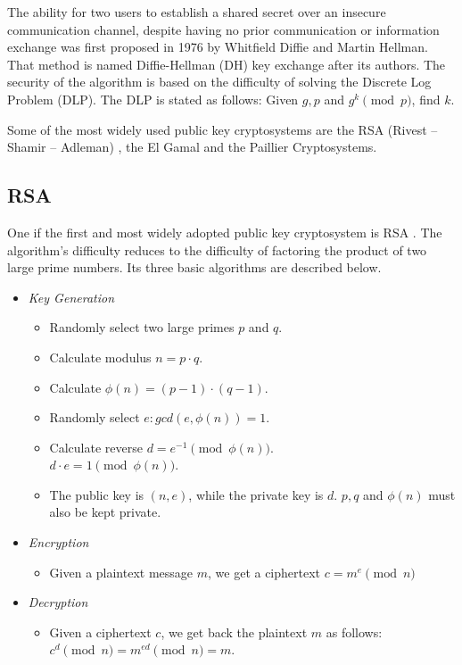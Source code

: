 The ability for two users to establish a shared secret over an insecure communication channel, despite having no prior communication or information exchange was first proposed in 1976 by Whitfield Diffie and Martin Hellman.
That method is named Diffie-Hellman (DH) key exchange \cite{diffie1976new} after its authors. The security of the algorithm is based on the difficulty of solving the Discrete Log Problem (DLP). The DLP is stated as follows: Given $g, p$ and $g^k \pmod{p}$, find $ k $.

Some of the most widely used public key cryptosystems are the RSA (Rivest -- Shamir -- Adleman) \cite{rivest1978method}, the El Gamal \cite{elgamal1985public} and the Paillier \cite{paillier1999public} Cryptosystems.

\subsection{RSA}

One if the first and most widely adopted public key cryptosystem is RSA . The algorithm's difficulty reduces to the difficulty of factoring the product of two large prime numbers. Its three basic algorithms are described below.

\begin{itemize}
  \item \textit{Key Generation}
  \begin{itemize}
    \item Randomly select two large primes $ p $ and $ q $.
    \item Calculate modulus $n = p \cdot q$.
    \item Calculate $\phi(n) = (p-1) \cdot (q-1)$.
    \item Randomly select $e : gcd(e,\phi(n)) = 1$.
    \item Calculate reverse $d  = e ^ {-1} \pmod{\phi(n)}$.\\
    $d \cdot e = 1 \pmod{\phi(n)}$.
    \item The public key is $(n, e)$, while the private key is $ d $. $p, q$ and $\phi(n)$ must also be kept private.
  \end{itemize}
  \item \textit{Encryption}
  \begin{itemize}
    \item Given a plaintext message $ m $, we get a ciphertext $c = m ^ e \pmod{n}$
  \end{itemize}
  \item \textit{Decryption}
  \begin{itemize}
    \item Given a ciphertext $ c $, we get back the plaintext $ m $ as follows: $c^d \pmod{n} = m^{ed} \pmod{n} = m$.
  \end{itemize}
\end{itemize}


